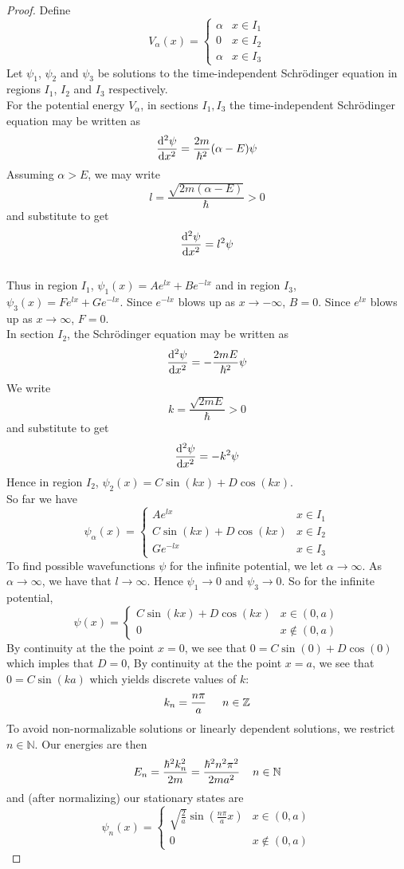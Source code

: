 \documentclass[12pt]{amsart}
\newcommand{\sch}{Schr\"{o}dinger }
\newcommand{\al}{\alpha}
\newcommand{\N}{\mathbb{N}}
\newcommand{\Z}{\mathbb{Z}}
\begin{document}
\begin{proof}
Define 
\[
V_\al(x) = 
\begin{cases}
\al & x \in I_1 \\
0 & x \in I_2\\
\al & x \in I_3
\end{cases}
\]
Let $\psi_1$, $\psi_2$ and  $\psi_3$ be solutions to the time-independent \sch equation in regions $I_1$, $I_2$ and $I_3$ respectively. \\
For the potential energy $V_\al$, in sections $I_1, I_3$ the time-independent \sch equation may be written as $$\dv[2]{\psi}{x} = \frac{2m}{\hbar^2}(\al-E)\psi$$ Assuming $\al > E$, we may write $$l = \frac{\sqrt{2m(\al-E)}}{\hbar} >0$$ and substitute to get $$\dv[2]{\psi}{x} = l^2\psi$$ \\
Thus in region $I_1$, $\psi_1(x) = Ae^{lx} + Be^{-lx}$ and in region $I_3$, $\psi_3(x) = Fe^{lx} + Ge^{-lx}$. Since $e^{-lx}$ blows up as $x \rightarrow - \infty$, $B=0$. Since $e^{lx}$ blows up as $x \rightarrow  \infty$, $F=0$. \vspace{4mm}\\
In section $I_2$, the \sch equation may be written as $$\dv[2]{\psi}{x} = -\frac{2mE}{\hbar^2}\psi$$ We write $$k = \frac{\sqrt{2mE}}{\hbar} >0$$ and substitute to get $$\dv[2]{\psi}{x} = -k^2\psi$$  
Hence in region $I_2$, $\psi_2(x) = C\sin(kx) + D \cos(kx)$. \vspace{.4cm}\\
So far we have 
\[
\psi_\al(x)= 
\begin{cases}
Ae^{lx} & x \in I_1 \\
C\sin(kx) + D \cos(kx)  & x \in I_2 \\
Ge^{-lx} & x \in I_3
\end{cases}
\]
To find possible wavefunctions $\psi$ for the infinite potential, we let $\al \rightarrow \infty$. As $\al \rightarrow \infty$, we have that $l \rightarrow \infty$. Hence $\psi_1 \rightarrow 0$ and $\psi_3 \rightarrow 0$. So for the infinite potential, 
\[
\psi(x)= 
\begin{cases}
C\sin(kx) + D \cos(kx)  & x \in (0,a) \\
0 & x \not \in (0,a)
\end{cases}
\] 
By continuity at the the point $x=0$, we see that $0 = C\sin(0) + D \cos(0)$ which imples that $D= 0$, By continuity at the the point $x=a$, we see that $0 = C\sin(ka)$ which yields discrete values of $k$: $$k_n = \frac{n \pi}{a} \hspace{.5cm} n \in \Z$$
To avoid non-normalizable solutions or linearly dependent solutions, we restrict $n \in \N$. Our energies are then $$E_n = \frac{\hbar^2k_n^2}{2m} = \frac{\hbar^2n^2 \pi^2}{2ma^2} \hspace{.4cm} n \in \N$$
and (after normalizing) our stationary states are 
\[
\psi_n(x)= 
\begin{cases}
\sqrt{\frac{2}{a}}\sin(\frac{n \pi}{a}x)  & x \in (0,a) \\
0 & x \not \in (0,a)
\end{cases}
\]
\end{proof}
\end{document}
